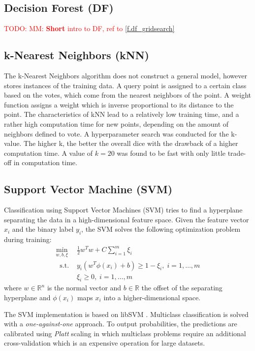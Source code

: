 \documentclass[journal]{IEEEtran}
\newcommand\TODO[1]{\textcolor{red}{TODO: #1}}
\begin{document}
\subsection{Decision Forest (DF)}
\TODO{MM: \textbf{Short} intro to DF, ref to \ref{f.df_gridsearch}}

\subsection{k-Nearest Neighbors (kNN)}
The k-Nearest Neighbors algorithm does not construct a general model, however stores instances of the training data. A query point is assigned to a certain class based on the votes, which come from the nearest neighbors of the point. A weight function assigns a weight which is inverse proportional to its distance to the point. The characteristics of kNN lead to a relatively low training time, and a rather high computation time for new points, depending on the amount of neighbors defined to vote. A hyperparameter search was conducted for the k-value. The higher k, the better the overall dice with the drawback of a higher computation time. A value of $k=20$ was found to be fast with only little trade-off in computation time.

\subsection{Support Vector Machine (SVM)}
Classification using Support Vector Machines (SVM) tries to find a hyperplane separating the data in a high-dimensional feature space. Given the feature vector $x_i$ and the binary label $y_i$, the SVM solves the following optimization problem during training:
\begin{equation}
\begin{split}
\min_{w, b, \xi} \ & \frac{1}{2}w^Tw + C\sum_{i=1}^m \xi_i \\
\ \text{ s.t. } & y_i(w^T\phi(x_i)+b) \geq 1-\xi_i, \; i = 1, \ldots, m \\
& \xi_i \geq 0, \; i = 1, \ldots, m
\end{split}
\end{equation}
where $w\in \mathbb{R}^n $ is the normal vector and $b \in \mathbb{R}$ the offset of the separating hyperplane and $\phi(x_i)$ maps $x_i$ into a higher-dimensional space.

The SVM implementation is based on libSVM \cite{chang2011libsvm}. Multiclass classification is solved with a \textit{one-against-one} approach. To output probabilities, the predictions are calibrated using \textit{Platt} scaling in which multiclass problems require an additional cross-validation which is an expensive operation for large datasets.
\end{document}

